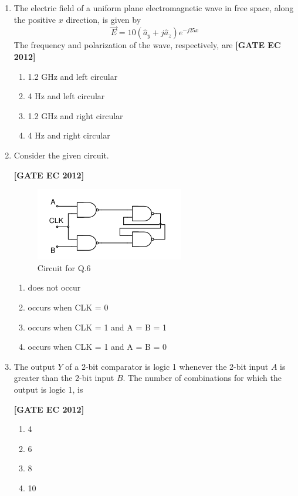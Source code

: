 \documentclass[12pt]{article}
\begin{document}
\begin{enumerate}[leftmargin=1.0em, label=\textbf{Q.\arabic*.}, itemsep=2em]
\item The electric field of a uniform plane electromagnetic wave in free space, along the positive $x$ direction, is given by
\[
\vec{E} = 10(\hat{a}_y + j \hat{a}_z) e^{-j25x}
\]
The frequency and polarization of the wave, respectively, are
\noindent \textbf{[GATE EC 2012]}
\begin{multicols}{2}
    \begin{enumerate}
        \item 1.2 GHz and left circular
        \item 4 Hz and left circular
        \item 1.2 GHz and right circular
        \item 4 Hz and right circular
    \end{enumerate}
\end{multicols}

\item Consider the given circuit.

\noindent \textbf{[GATE EC 2012]}
\begin{figure}[H]\centering
\includegraphics[width=0.5\columnwidth]{figs/q6.png}
\caption{Circuit for Q.6}
\label{fig:q6}
\end{figure}
\begin{multicols}{2}
    \begin{enumerate}
        \item does not occur
        \item occurs when CLK = 0
        \item occurs when CLK = 1 and A = B = 1
        \item occurs when CLK = 1 and A = B = 0
    \end{enumerate}
\end{multicols}

\item The output $Y$ of a 2-bit comparator is logic 1 whenever the 2-bit input $A$ is greater than the 2-bit input $B$. The number of combinations for which the output is logic 1, is

\noindent \textbf{[GATE EC 2012]}
\begin{multicols}{2}
    \begin{enumerate}
        \item 4
        \item 6
        \item 8
        \item 10
    \end{enumerate}
\end{multicols}


\end{enumerate}
\end{document}
